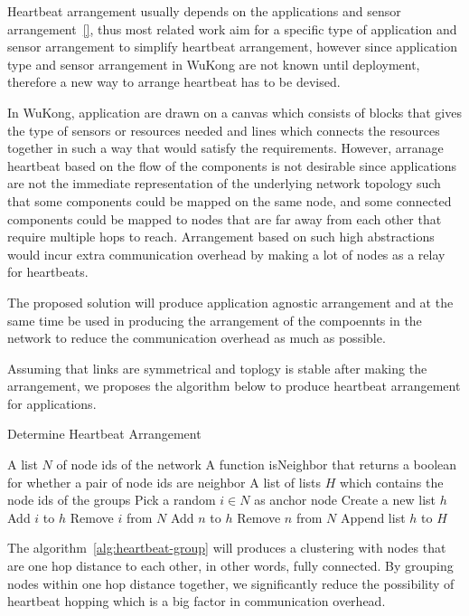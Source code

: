 Heartbeat arrangement usually depends on the applications and sensor
arrangement~\ref{}, thus most related work aim for a specific type of
application and sensor arrangement to simplify heartbeat arrangement, however
since application type and sensor arrangement in WuKong are not known until
deployment, therefore a new way to arrange heartbeat has to be devised.

In WuKong, application are drawn on a canvas which consists of blocks that
gives the type of sensors or resources needed and lines which connects the
resources together in such a way that would satisfy the requirements. However,
arranage heartbeat based on the flow of the components is not desirable since
applications are not the immediate representation of the underlying network
topology such that some components could be mapped on the same node, and some
connected components could be mapped to nodes that are far away from each other
that require multiple hops to reach. Arrangement based on such high
abstractions would incur extra communication overhead by making a lot of nodes
as a relay for heartbeats.

The proposed solution will produce application agnostic arrangement and at
the same time be used in producing the arrangement of the compoennts in the
network to reduce the communication overhead as much as possible.

Assuming that links are symmetrical and toplogy is stable after making the
arrangement, we proposes the algorithm below to produce heartbeat arrangement
for applications.

\begin{algorithm}
\caption{Determine Heartbeat Arrangement}
\label{alg:heartbeat-group}
\begin{algorithmic}
\Require A list $N$ of node ids of the network
\Require A function isNeighbor that returns a boolean for whether a pair of
  node ids are neighbor
\Ensure A list of lists $H$ which contains the node ids of the groups
  \State Pick a random $i \in N$ as anchor node
  \State Create a new list $h$
  \State Add $i$ to $h$
  \State Remove $i$ from $N$
      \State Add $n$ to $h$
      \State Remove $n$ from $N$
    \EndIf
  \EndFor
  \State Append list $h$ to $H$
\EndWhile
\end{algorithmic}
\end{algorithm}

The algorithm~\ref{alg:heartbeat-group} will produces a clustering with nodes
that are one hop distance to each other, in other words, fully connected. By
grouping nodes within one hop distance together, we significantly reduce the
possibility of heartbeat hopping which is a big factor in communication
overhead.


